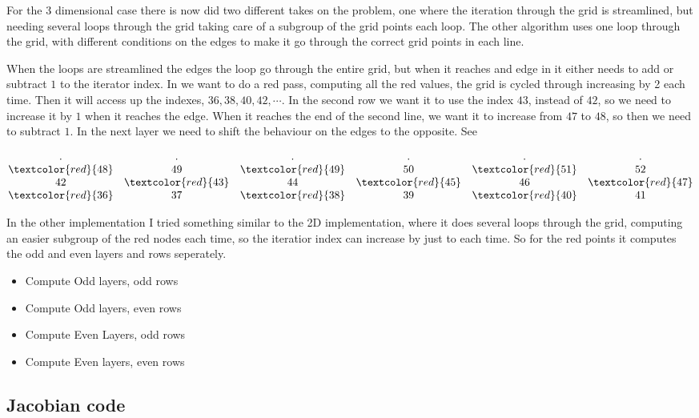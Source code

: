 	For the 3 dimensional case there is now did two different takes on the problem, one where the iteration through the grid is streamlined, but needing
	several loops through the grid taking care of a subgroup of the grid points each loop. The other algorithm uses one loop through the grid,
	with different conditions on the edges to make it go through the correct grid points in each line.

	When the loops are streamlined the edges the loop go through the entire grid, but when it reaches and edge in it either needs to add or subtract \(1\) to
	the iterator index. In \label{eq:RB_loop} we want to do a red pass, computing all the red values, the grid is cycled through increasing by 2 each time.
	Then it will access up the indexes, \(36, 38, 40,42, \cdots\). In the second row we want it to use the index \(43\), instead of \(42\), so we need to
	increase it by \(1\) when it reaches the edge. When it reaches the end of the second line, we want it to increase from \(47\) to \(48\),
	so then we need to subtract \(1\). In the next layer we need to shift the behaviour on the edges to the opposite. See

	\[
	\begin{matrix}
	.	&	.	&	. &	.	& .	& .
	\\
	\textcolor{red}{48} &49 &\textcolor{red}{49} &50 & \textcolor{red}{51} &52
	\\
	42	& \textcolor{red}{43} &44 &\textcolor{red}{45} &46 &\textcolor{red}{47}
	\\
	\textcolor{red}{36} & 37 &\textcolor{red}{38}  &39 & \textcolor{red}{40} & 41
	\end{matrix}
	\label{eq:RB-loop}
	\]

	In the other implementation I tried something similar to the 2D implementation, where it does several
	loops through the grid, computing an easier subgroup of the red nodes each time, so the iteratior index
	can increase by just to each time. So for the red points it computes the odd and even layers and rows seperately.

	\begin{itemize}
		\item Compute Odd layers, odd rows
		\item Compute Odd layers, even rows
		\item Compute Even Layers, odd rows
		\item Compute Even layers, even rows
	\end{itemize}


	\newpage
	\subsection{Jacobian code}
	\label{sec:jacobian}

